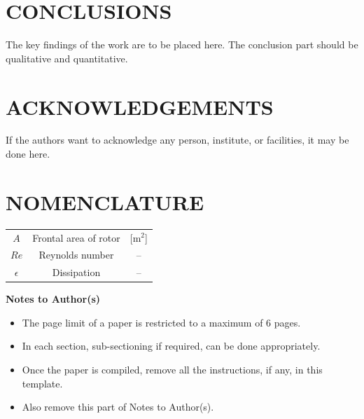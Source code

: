 \documentclass[10pt, conference]{IHMTC2023}
\begin{document}
\section{\textbf{CONCLUSIONS}}\label{sec4}
The key findings of the work are to be placed here. The conclusion part should be qualitative and quantitative. 

\vspace{0.5cm}
\noindent
\section*{\textbf{ACKNOWLEDGEMENTS}}
If the authors want to acknowledge any person, institute, or facilities, it may be done here. 

\vspace{0.5cm}
 \noindent
\section*{\textbf{NOMENCLATURE}}
\begin{tabular}{ccc}
$A$ & Frontal area of rotor & [m$^2$]\\
$Re$ & Reynolds number & -- \\
$\epsilon$ & Dissipation & --
\end{tabular}




\newpage
\vspace{0.5cm}
\noindent
\textbf{Notes to Author(s)}\\
\begin{itemize}
\item{The page limit of a paper is restricted to a maximum of 6 pages.} \\
\item{In each section, sub-sectioning if required, can be done appropriately.} \\ 
\item{Once the paper is compiled, remove all the instructions, if any, in this template.} \\ 
\item{Also remove this part of Notes to Author(s).} \\
\end{itemize}
\end{document}
